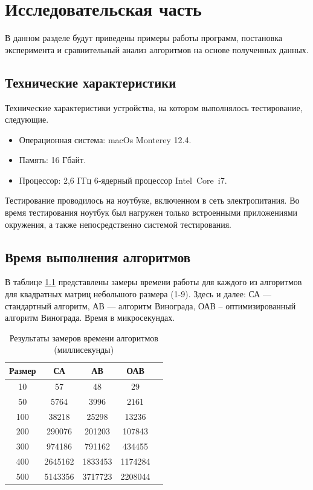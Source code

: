 \chapter{Исследовательская часть}

В данном разделе будут приведены примеры работы программ,
постановка эксперимента и сравнительный анализ алгоритмов на основе
полученных данных.

\section{Технические характеристики}

Технические характеристики устройства, на котором выполнялось тестирование,
следующие.

\begin{itemize}
	\item Операционная система: macOs Monterey 12.4\cite{ubuntu}.
	\item Память: 16 Гбайт.
	\item Процессор: 2,6 ГГц 6‑ядерный процессор Intel Core i7\cite{intel}.
\end{itemize}

Тестирование проводилось на ноутбуке, включенном в сеть электропитания.
Во время тестирования ноутбук был нагружен только встроенными приложениями
окружения, а также непосредственно системой тестирования.


\section{Время выполнения алгоритмов}

В таблице \ref{tab:time0} представлены замеры времени работы для каждого из алгоритмов для квадратных матриц небольшого размера (1-9). Здесь и далее: СА — стандартный алгоритм, АВ — алгоритм Винограда, ОАВ -- оптимизированный алгоритм Винограда. Время в микросекундах.

\begin{table}[h]
	\begin{center}
		\captionsetup{justification=raggedright,singlelinecheck=off}
		\caption{\label{tab:time0}Результаты замеров времени алгоритмов (миллисекунды)}
		\begin{tabular}{|c|c|c|c|c|}
		\hline
		Размер & СА &  АВ & ОАВ \\
		\hline
		10  & 57 & 48 & 29\\
		\hline
		50  & 5764 & 3996 & 2161\\
		\hline
		100  & 38218 & 25298 & 13236 \\
		\hline
		200  & 290076 & 201203 & 107843 \\
		\hline
		300  & 974186 & 791162 & 434455 \\
		\hline
		400  & 2645162 & 1833453 & 1174284 \\
		\hline
		500  & 5143356 & 3717723 & 2208044 \\
		\hline
		\end{tabular}
	\end{center}
\end{table}

